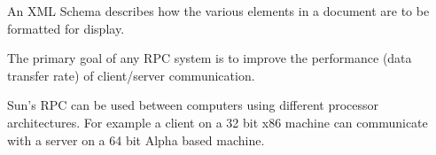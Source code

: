 \documentclass[12pt]{examdesign}
\begin{document}
\begin{truefalse}
  \begin{question}
     An XML Schema describes how the various elements in a document are to be
    formatted for display.
  \end{question}

  \begin{question}
     The primary goal of any RPC system is to improve the performance (data
    transfer rate) of client/server communication.
  \end{question}
  
  \begin{question}
     Sun's RPC can be used between computers using different processor
    architectures. For example a client on a 32 bit x86 machine can communicate with a server on
    a 64 bit Alpha based machine.
  \end{question}

\end{truefalse}
\end{document}
